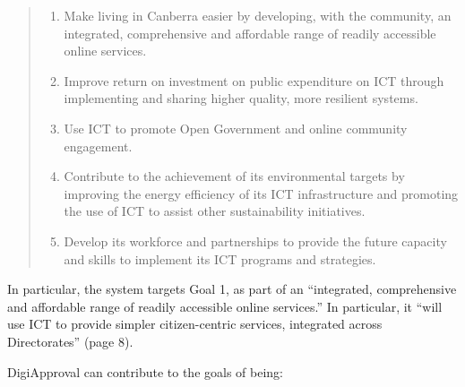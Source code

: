 \documentclass[12pt,a4paper,twosided]{article}
\begin{document}
\begin{quote}
\begin{enumerate}

\item
  Make living in Canberra easier by developing, with the community, an
  integrated, comprehensive and affordable range of readily accessible
  online services.
\item
  Improve return on investment on public expenditure on ICT through
  implementing and sharing higher quality, more resilient systems.
\item
  Use ICT to promote Open Government and online community engagement.
\item
  Contribute to the achievement of its environmental targets by
  improving the energy efficiency of its ICT infrastructure and
  promoting the use of ICT to assist other sustainability initiatives.
\item
  Develop its workforce and partnerships to provide the future capacity
  and skills to implement its ICT programs and strategies.
\end{enumerate}
\end{quote}

In particular, the system targets Goal 1, as part of an ``integrated,
comprehensive and affordable range of readily accessible online
services.'' In particular, it ``will use ICT to provide simpler
citizen-centric services, integrated across Directorates'' (page 8).

DigiApproval can contribute to the goals of being:
\end{document}

